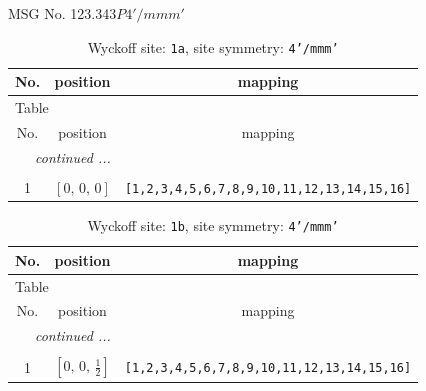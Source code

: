 \documentclass[fleqn,8pt]{jsarticle}
\begin{document}
\setcounter{MaxMatrixCols}{32}

\renewcommand{\tablename}{Table~}
\renewcommand{\figurename}{Figure~}
\begin{center}
\LARGE
MSG No. 123.343\quad$P4'/mmm'$
\end{center}
\renewcommand{\arraystretch}{1.2}
\begin{longtable}{ccc}
\caption{Wyckoff site: {\tt 1a}, site symmetry: {\tt 4'/mmm'}}
 \\
 \hline \hline
No. & position & mapping \\ \hline \endfirsthead

\multicolumn{2}{l}{\tablename\ \thetable{}} \\
 \hline \hline
No. & position & mapping \\ \hline \endhead

 \hline \hline
\multicolumn{2}{r}{\footnotesize\it continued ...} \\ \endfoot

 \hline \hline
\multicolumn{2}{r}{} \\ \endlastfoot

1 & $\left[ 0,\, 0,\, 0 \right]$ & {\tt [1,2,3,4,5,6,7,8,9,10,11,12,13,14,15,16]} \\
\end{longtable}
\renewcommand{\arraystretch}{1.2}
\begin{longtable}{ccc}
\caption{Wyckoff site: {\tt 1b}, site symmetry: {\tt 4'/mmm'}}
 \\
 \hline \hline
No. & position & mapping \\ \hline \endfirsthead

\multicolumn{2}{l}{\tablename\ \thetable{}} \\
 \hline \hline
No. & position & mapping \\ \hline \endhead

 \hline \hline
\multicolumn{2}{r}{\footnotesize\it continued ...} \\ \endfoot

 \hline \hline
\multicolumn{2}{r}{} \\ \endlastfoot

1 & $\left[ 0,\, 0,\, \frac{1}{2} \right]$ & {\tt [1,2,3,4,5,6,7,8,9,10,11,12,13,14,15,16]} \\
\end{longtable}
\renewcommand{\arraystretch}{1.2}
\end{document}
